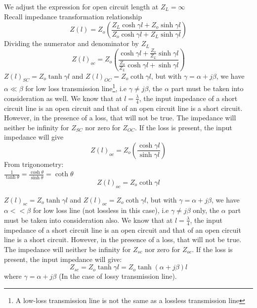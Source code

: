 We adjust the expression for open circuit length at $ Z_{L} =\infty $ \\
Recall impedance transformation relationship
\begin{equation}
Z(l) = Z_{o}\left(\frac{Z_{L}\cosh\gamma l + Z_{o}\sinh\gamma l}{Z_{o}\cosh\gamma l + Z_{L}\sinh\gamma l}\right)
\end{equation}
Dividing the numerator and denominator by $ Z_{L} $
\begin{equation}
Z(l)_{oc} = Z_{o}\left(\frac{\cosh\gamma l +\frac{Z_{o}}{Z_{L}}\sinh\gamma l}{\frac{Z_{o}}{Z_{L}}\cosh\gamma l+ \sinh\gamma l}\right)
\end{equation}
$ Z(l)_{SC}=Z_{o}\tanh\gamma l $ and $ Z(l)_{OC}=Z_{o}\coth\gamma l $, but with $ \gamma=\alpha +j\beta $, we have $ \alpha\ll\beta $ for low loss transmission line\footnote{
A low-loss transmission line is not the same as a lossless transmission line
}, i.e $ \gamma\neq j\beta $, the $ \alpha $ part must be taken into consideration as well. We know that at $ l=\frac{\lambda}{4} $, the input impedance of a short circuit line is an open circuit and that of an open circuit line is a short circuit. However, in the presence of a loss, that will not be true. The impedance will neither be infinity for $ Z_{SC} $ nor zero for $ Z_{OC} $. If the loss is present, the input impedance will give
\begin{equation}
Z(l)_{oc} = Z_{o}\left(\frac{\cosh\gamma l}{\sinh\gamma l}\right)
\end{equation} 
From trigonometry:\\
$ \frac{1}{\tanh\theta}=\frac{\cosh\theta}{\sinh\theta}=\coth\theta $
\begin{equation}
\boxed{Z(l)_{oc}=Z_{o}\coth\gamma l}	
\end{equation}

$ Z(l)_{sc}=Z_{o}\tanh\gamma l $ and $ Z(l)_{oc}=Z_{o}\coth\gamma l $, but with $ \gamma=\alpha +j\beta $, we have $ \alpha<<\beta $ for low loss line (not lossless in this case), i.e $ \gamma\neq j\beta $ only, the $ \alpha $ part must be taken into consideration also. We know that at $ l=\frac{\lambda}{4} $, the input impedance of a short circuit line is an open circuit and that of an open circuit line is a short circuit. However, in the presence of a loss, that will not be true. The impedance will neither be infinity for $ Z_{sc} $ nor zero for $ Z_{oc} $. If the loss is present, the input impedance will give:\\
\begin{equation}
Z_{sc}=Z_{o}\tanh\gamma l=Z_{o}\tanh(\alpha+j\beta)l
\end{equation}
where $ \gamma=\alpha+j\beta $ (In the case of lossy transmission line).\\

